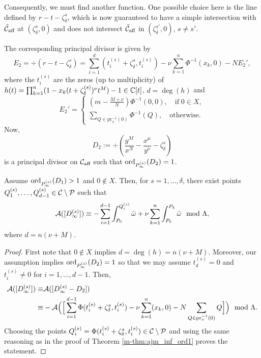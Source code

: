 \documentclass[main.tex]{subfiles}
\begin{document}
    Consequently, we must find another function. One possible choice here is the line defined by $r - t -  \zeta_{\delta}^s$, which
    is now guaranteed to have a simple intersection with $\tilde{\mathcal{C}}_{\text{aff}}$
    at $(\zeta_{\delta}^s,0)$ and does not intersect $\tilde{\mathcal{C}}_{\text{aff}}$ in $(\zeta_{\delta}^{s'},0)$, $s \ne s'$.

    The corresponding principal divisor is given by
     \begin{equation*}
      E_2 = \div(r - t - \zeta_{\delta}^s) = \sum_{i = 1}^{d} (t_i^{(s)}+\zeta_{\delta}^s,t_i^{(s)}) - \nu \sum_{k=1}^n
      \Phi^{-1}(x_k,0)- N E_2',
   \end{equation*}
      where the $t_i^{(s)}$ are the zeros (up to multiplicity) of $h(t) = \prod_{k=1}^n (1-x_k(t+\zeta_{\delta}^{(s)})^{\nu}t^M) - 1 \in \mathbb{C}[t]$, $d = \deg(h)$ and
    \begin{equation}\label{eq:zero_bp2}
       E_2' = \begin{cases}
	   (m-\frac{M+\nu}{N}) \Phi^{-1}(0,0), \quad \text{if} \; 0 \in X, \\
             \sum_{Q \in\text{pr}_x^{-1}(0)} \Phi^{-1}(Q), \quad \text{otherwise.}
             \end{cases}
    \end{equation}
    Now,
    \begin{equation*}
     D_2 := \div \left( \frac{y^M}{x^N} - \frac{x^{\mu}}{y^{\nu}} - \zeta_{\delta}^s \right)
    \end{equation*}
    is a principal divisor on $\mathcal{C}_{\text{aff}}$ such that
    $\operatorname{ord}_{P_{\infty}^{(s)}}(D_2) = 1$.

    \begin{thm}\label{thm:ajm_inf_ordgt1}
      Assume $\operatorname{ord}_{P_{\infty}^{(s)}}(D_1) > 1$ and $0 \not\in X$. Then, for $s = 1,\dots,\delta$, there exist points $Q_1^{(s)},\dots,Q_{d-1}^{(s)} \in \mathcal{C} \setminus \mathcal{P}$ such that
    \begin{equation*}%
       \AJ( [D_{\infty}^{(s)}] ) \equiv -\sum_{i = 1}^{d-1} \int_{P_0}^{Q_i^{(s)}} \bar\w + \nu \sum_{k=1}^n
      \int_{P_0}^{P_k} \bar\w \mod \Lambda,
    \end{equation*}
    where $d = n(\nu+M)$.
    \end{thm}
   \begin{proof}
    First note that $0 \not\in X$ implies $d = \deg(h) = n(\nu+M)$. Moreover, our assumption implies $\operatorname{ord}_{P_{\infty}^{(s)}}(D_2) = 1$ so that we may assume
    $t_d^{(s)} = 0$ and $t_i^{(s)} \ne 0$ for $i=1,\dots,d-1$. 	Then,
    \begin{align*}
     \mathcal{A}( [D_{\infty}^{(s)}] ) \equiv & \mathcal{A}([D_{\infty}^{(s)} - D_2]) \\
      \equiv & -\mathcal{A} \Big( \Big[ \sum_{i = 1}^{d-1} \Phi(t_i^{(s)}+\zeta_{\delta}^s,t_i^{(s)}) - \nu \sum_{k=1}^n
      (x_k,0) - N \sum_{Q \in\text{pr}_x^{-1}(0)} Q \Big] \Big)
       \mod \Lambda.
    \end{align*}
   Choosing the points
    $Q_i^{(s)} = \Phi(t_i^{(s)}+\zeta_{\delta}^s,t_i^{(s)}) \in \mathcal{C} \setminus \mathcal{P}$ and
     using the same reasoning as in the proof of Theorem \ref{m-thm:ajm_inf_ord1}
    proves the statement.
     \end{proof}
\end{document}
